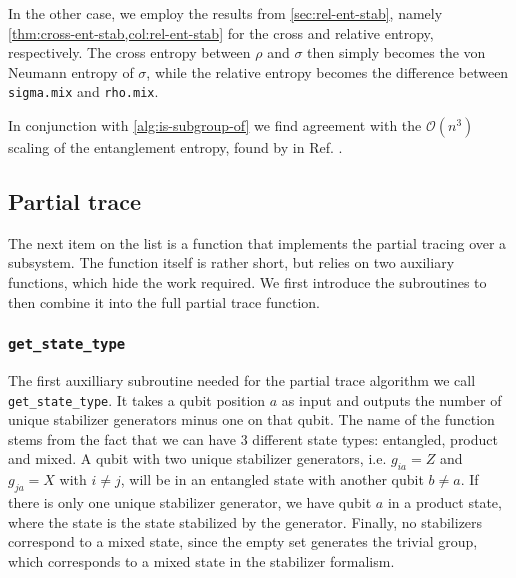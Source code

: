 In the other case, we employ the results from \cref{sec:rel-ent-stab}, namely
\cref{thm:cross-ent-stab,col:rel-ent-stab} for the cross and relative entropy,
respectively.  The cross entropy between $\rho$ and $\sigma$ then simply
becomes the von Neumann entropy of $\sigma$, while the relative entropy becomes
the difference between \verb|sigma.mix| and \verb|rho.mix|.

In conjunction with \cref{alg:is-subgroup-of} we find agreement with the
$\mathcal{O}\left( n^3 \right)$ scaling of the entanglement entropy, found by
\citeauthor{fattalEntanglementStabilizerFormalism2004} in Ref.
\cite{fattalEntanglementStabilizerFormalism2004}.

\subsection{Partial trace}\label{sec:ptrace}
The next item on the list is a function that implements the partial tracing
over a subsystem. The function itself is rather short, but relies on two
auxiliary functions, which hide the work required. We first introduce the
subroutines to then combine it into the full partial trace function.

\subsubsection{\texttt{get\_state\_type}}
The first auxilliary subroutine needed for
the partial trace algorithm we call \texttt{get\_state\_type}. It
takes a qubit position $a$ as input and outputs the number of unique stabilizer
generators minus one on that qubit. The name of the function stems from the
fact that we can have $3$ different state types: entangled, product and mixed.
A qubit with two unique stabilizer generators, i.e. $g_{ia} = Z$ and $g_{ja} =
X$ with $i\neq j$, will be in an entangled state with another qubit $b\neq a$.
If there is only one unique stabilizer generator, we have qubit $a$ in a
product state, where the state is the state stabilized by the generator.
Finally, no stabilizers correspond to a mixed state, since the empty set
generates the trivial group, which corresponds to a mixed state in the
stabilizer formalism.

